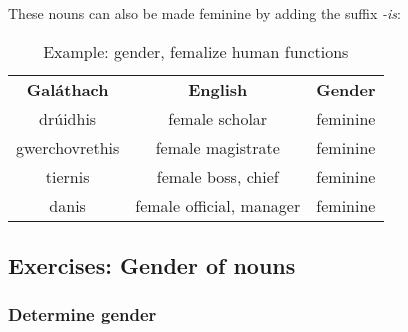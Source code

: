 These nouns can also be made feminine by adding the suffix \textit{-is}:
\begin{table}[H]
\centering
\begin{tabular}{ccc}
  \toprule
  \textbf{Gal\'{a}thach} & \textbf{English} & \textbf{Gender}\\
  \cmidrule(lr){1-1}\cmidrule(lr){2-2}\cmidrule(lr){3-3}
  dr\'{u}idhis & female scholar & feminine\\
  gwerchovrethis & female magistrate & feminine\\
  tiernis & female boss, chief & feminine\\
  danis & female official, manager & feminine\\
  \bottomrule
\end{tabular}
\caption{Example: gender, femalize human functions}
\label{example_gender_human_functions_femalize}
\end{table}

\newpage
\subsection{Exercises: Gender of nouns}

\subsubsection{Determine gender}

